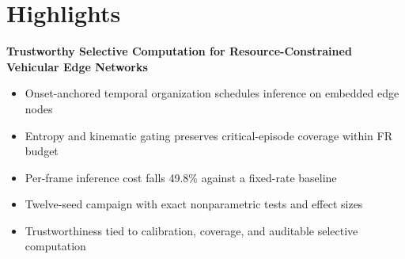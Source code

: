 \documentclass[12pt]{article}
\begin{document}
\section*{Highlights}
\noindent\textbf{Trustworthy Selective Computation for Resource-Constrained Vehicular Edge Networks}
\begin{itemize}
  \item Onset-anchored temporal organization schedules inference on embedded edge nodes
  \item Entropy and kinematic gating preserves critical-episode coverage within FR budget
  \item Per-frame inference cost falls 49.8\% against a fixed-rate baseline
  \item Twelve-seed campaign with exact nonparametric tests and effect sizes
  \item Trustworthiness tied to calibration, coverage, and auditable selective computation
\end{itemize}
\end{document}

